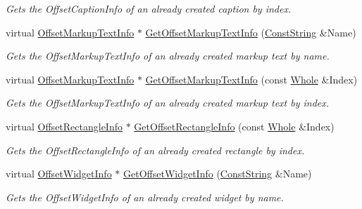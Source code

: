 \begin{DoxyCompactItemize}
\begin{DoxyCompactList}\small\item\em Gets the OffsetCaptionInfo of an already created caption by index. \item\end{DoxyCompactList}\item 
virtual \hyperlink{structMezzanine_1_1UI_1_1ResizingInfo}{OffsetMarkupTextInfo} $\ast$ \hyperlink{classMezzanine_1_1UI_1_1RenderableContainerWidget_ac399e3b87cb416612916a83db872edbb}{GetOffsetMarkupTextInfo} (\hyperlink{namespaceMezzanine_a63cd699ac54b73953f35ec9cfc05e506}{ConstString} \&Name)
\begin{DoxyCompactList}\small\item\em Gets the OffsetMarkupTextInfo of an already created markup text by name. \item\end{DoxyCompactList}\item 
virtual \hyperlink{structMezzanine_1_1UI_1_1ResizingInfo}{OffsetMarkupTextInfo} $\ast$ \hyperlink{classMezzanine_1_1UI_1_1RenderableContainerWidget_a6e6cf9cca3582fe18e29e06005c4b100}{GetOffsetMarkupTextInfo} (const \hyperlink{namespaceMezzanine_adcbb6ce6d1eb4379d109e51171e2e493}{Whole} \&Index)
\begin{DoxyCompactList}\small\item\em Gets the OffsetMarkupTextInfo of an already created markup text by index. \item\end{DoxyCompactList}\item 
virtual \hyperlink{structMezzanine_1_1UI_1_1ResizingInfo}{OffsetRectangleInfo} $\ast$ \hyperlink{classMezzanine_1_1UI_1_1RenderableContainerWidget_aadbd42f96fcdd57ece45b945b7e647e8}{GetOffsetRectangleInfo} (const \hyperlink{namespaceMezzanine_adcbb6ce6d1eb4379d109e51171e2e493}{Whole} \&Index)
\begin{DoxyCompactList}\small\item\em Gets the OffsetRectangleInfo of an already created rectangle by index. \item\end{DoxyCompactList}\item 
virtual \hyperlink{structMezzanine_1_1UI_1_1ResizingInfo}{OffsetWidgetInfo} $\ast$ \hyperlink{classMezzanine_1_1UI_1_1RenderableContainerWidget_ac361c86ce02772e4206d20159fd4d49f}{GetOffsetWidgetInfo} (\hyperlink{namespaceMezzanine_a63cd699ac54b73953f35ec9cfc05e506}{ConstString} \&Name)
\begin{DoxyCompactList}\small\item\em Gets the OffsetWidgetInfo of an already created widget by name. \item\end{DoxyCompactList}\item 

\end{DoxyCompactItemize}
